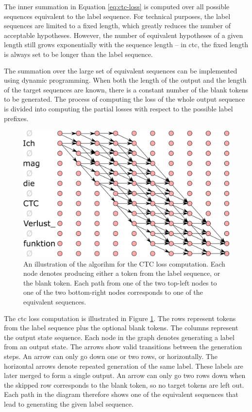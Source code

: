 The inner summation in Equation \ref{eq:ctc-loss} is computed over all possible
sequences equivalent to the label sequence. For technical purposes, the label
sequences are limited to a fixed length, which greatly reduces the number of
acceptable hypotheses. However, the number of equivalent hypotheses of a given
length still grows exponentially with the sequence length -- in \ac{ctc}, the
fixed length is always set to be longer than the label sequence. 

The summation over the large set of equivalent sequences can be
implemented using dynamic programming. When both the length of the output and
the length of the target sequences are known, there is a constant number of the
blank tokens to be generated. The process of computing the loss of the whole
output sequence is divided into computing the partial losses with respect to
the possible label prefixes.

\begin{figure}
  \centering

  \includegraphics[width=13cm]{img/ctc_schema.png}

  \caption{An illustration of the algorihm for the CTC loss computation. Each
    node denotes producing either a token from the label sequence, or the blank
    token. Each path from one of the two top-left nodes to one of the two
    bottom-right nodes corresponds to one of the equivalent sequences.  }
  \label{fig:ctc-dynamic-programming}
\end{figure}

The \ac{ctc} loss computation is illustrated in Figure
\ref{fig:ctc-dynamic-programming}. The rows represent tokens from the label
sequence plus the optional blank tokens. The columns represent the output state
sequence.  Each node in the graph denotes generating a label from an output
state. The arrows show valid transitions between the generation steps. An arrow
can only go down one or two rows, or horizontally.  The horizontal arrows
denote repeated generation of the same label. These labels are later merged to
form a single output. An arrow can only go two rows down when the skipped row
corresponds to the blank token, so no target tokens are left out. Each path in
the diagram therefore shows one of the equivalent sequences that lead to
generating the given label sequence.

